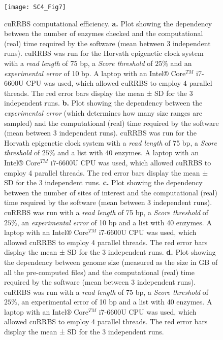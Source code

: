 \begin{figure}[htbp!] 
	\centering    
	\texttt{[image: SC4\_Fig7]}
	\vspace*{1mm}
	\caption[cuRRBS computational efficiency]{cuRRBS computational efficiency. \textbf{a.} Plot showing the dependency between the number of enzymes checked and the computational (real) time required by the software (mean between 3 independent runs). cuRRBS was run for the Horvath epigenetic clock system \cite{Horvath2013} with a \textit{read length} of 75 bp, a \textit{Score threshold} of $25\%$ and an \textit{experimental error} of 10 bp. A laptop with an Intel® Core$^{TM}$ i7-6600U CPU was used, which allowed cuRRBS to employ 4 parallel threads. The red error bars display the mean ± \acrshort{SD} for the 3 independent runs. \textbf{b.} Plot showing the dependency between the \textit{experimental error} (which determines how many size ranges are sampled) and the computational (real) time required by the software (mean between 3 independent runs). cuRRBS was run for the Horvath epigenetic clock system \cite{Horvath2013} with a \textit{read length} of 75 bp, a \textit{Score threshold} of $25\%$ and a list with 40 enzymes. A laptop with an Intel® Core$^{TM}$ i7-6600U CPU was used, which allowed cuRRBS to employ 4 parallel threads. The red error bars display the mean ± SD for the 3 independent runs. \textbf{c.} Plot showing the dependency between the number of sites of interest and the computational (real) time required by the software (mean between 3 independent runs). cuRRBS was run with a \textit{read length} of 75 bp, a \textit{Score threshold} of $25\%$, an \textit{experimental error} of 10 bp and a list with 40 enzymes. A laptop with an Intel® Core$^{TM}$ i7-6600U CPU was used, which allowed cuRRBS to employ 4 parallel threads. The red error bars display the mean ± SD for the 3 independent runs. \textbf{d.} Plot showing the dependency between genome size (measured as the size in GB of all the pre-computed files) and the computational (real) time required by the software (mean between 3 independent runs). cuRRBS was run with a \textit{read length} of 75 bp, a \textit{Score threshold} of $25\%$, an experimental error of 10 bp and a list with 40 enzymes. A laptop with an Intel® Core$^{TM}$ i7-6600U CPU was used, which allowed cuRRBS to employ 4 parallel threads. The red error bars display the mean ± SD for the 3 independent runs.}
	\label{fig:sc4_fig7}
\end{figure}


